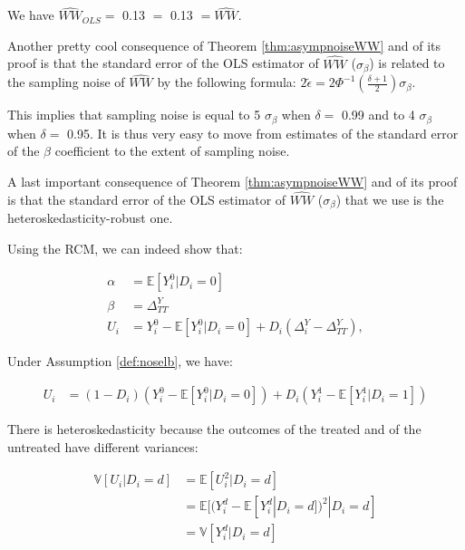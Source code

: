\documentclass[]{book}
\newenvironment{Shaded}{\begin{snugshade}}{\end{snugshade}}
\newcommand{\DecValTok}[1]{\textcolor[rgb]{0.00,0.00,0.81}{#1}}
\newcommand{\KeywordTok}[1]{\textcolor[rgb]{0.13,0.29,0.53}{\textbf{#1}}}
\newcommand{\NormalTok}[1]{#1}
\newcommand{\OperatorTok}[1]{\textcolor[rgb]{0.81,0.36,0.00}{\textbf{#1}}}
\newcommand{\StringTok}[1]{\textcolor[rgb]{0.31,0.60,0.02}{#1}}
\newcommand{\esp}[1]{\mathbb{E}[ #1 ]}
\newcommand{\var}[1]{\mathbb{V}[ #1 ]}
\theoremstyle{definition}
\theoremstyle{definition}
\theoremstyle{definition}
\theoremstyle{remark}
\let\BeginKnitrBlock\begin \let\EndKnitrBlock\end
\begin{document}
\begin{Shaded}
\end{Shaded}

We have \(\hat{WW}_{OLS}=\) 0.13 \(=\) 0.13 \(=\hat{WW}\).

\BeginKnitrBlock{remark}
\iffalse{} {Remark. } \fi{}Another pretty cool consequence of Theorem \ref{thm:asympnoiseWW} and of its proof is that the standard error of the OLS estimator of \(\hat{WW}\) (\(\sigma_{\beta}\)) is related to the sampling noise of \(\hat{WW}\) by the following formula:
\(2\tilde{\epsilon}=2\Phi^{-1}\left(\frac{\delta+1}{2}\right)\sigma_{\beta}\).
\EndKnitrBlock{remark}

This implies that sampling noise is equal to 5 \(\sigma_{\beta}\) when \(\delta=\) 0.99 and to 4 \(\sigma_{\beta}\) when \(\delta=\) 0.95.
It is thus very easy to move from estimates of the standard error of the \(\beta\) coefficient to the extent of sampling noise.

\BeginKnitrBlock{remark}
\iffalse{} {Remark. } \fi{}A last important consequence of Theorem \ref{thm:asympnoiseWW} and of its proof is that the standard error of the OLS estimator of \(\hat{WW}\) (\(\sigma_{\beta}\)) that we use is the heteroskedasticity-robust one.
\EndKnitrBlock{remark}

Using the RCM, we can indeed show that:

\begin{align*}
    \alpha & = \esp{Y_i^0|D_i=0}  \\
    \beta  & =  \Delta^Y_{TT} \\
    U_i    & = Y^0_i-\esp{Y^0_i|D_i=0} + D_i(\Delta^Y_i-\Delta^Y_{TT}),
    \end{align*}

Under Assumption \ref{def:noselb}, we have:

\begin{align*}
    U_i    & = (1-D_i)(Y^0_i-\esp{Y^0_i|D_i=0}) + D_i(Y_i^1-\esp{Y^1_i|D_i=1})
  \end{align*}

There is heteroskedasticity because the outcomes of the treated and of the untreated have different variances:

\begin{align*}
    \var{U_i|D_i=d} & = \esp{U_i^2|D_i=d}  \\
                    & = \esp{(Y^d_i-\esp{Y^d_i|D_i=d})^2|D_i=d}  \\
                    & = \var{Y_i^d|D_i=d}
  \end{align*}
\end{document}
